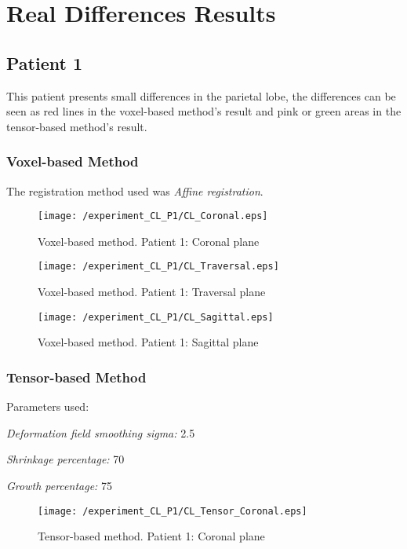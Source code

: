 \section{Real Differences Results}

\subsection{Patient 1}
This patient presents small differences in the parietal lobe, the
differences can be seen as red lines in the voxel-based method's result
and pink or green areas in the tensor-based method's result.

\subsubsection{Voxel-based Method}
The registration method used was \textit{Affine registration}.

\begin{figure}[H]
  \centering
  \texttt{[image: /experiment\_CL\_P1/CL\_Coronal.eps]}
  \caption{Voxel-based method. Patient 1: Coronal plane}
  \label{CL_Coronal}
\end{figure}

\begin{figure}[H]
  \centering
  \texttt{[image: /experiment\_CL\_P1/CL\_Traversal.eps]}
  \caption{Voxel-based method. Patient 1: Traversal plane}
  \label{CL_Traversal}
\end{figure}

\begin{figure}[H]
  \centering
  \texttt{[image: /experiment\_CL\_P1/CL\_Sagittal.eps]}
  \caption{Voxel-based method. Patient 1: Sagittal plane}
  \label{CL_Sagittal}
\end{figure}


\subsubsection{Tensor-based Method}
Parameters used:
\begin{description}
\item \textit{Deformation field smoothing sigma:} 2.5
\item \textit{Shrinkage percentage:} 70
\item \textit{Growth percentage:} 75
\end{description}

\begin{figure}[H]
  \centering
  \texttt{[image: /experiment\_CL\_P1/CL\_Tensor\_Coronal.eps]}
  \caption{Tensor-based method. Patient 1: Coronal plane}
  \label{CL_TCoronal}
\end{figure}

